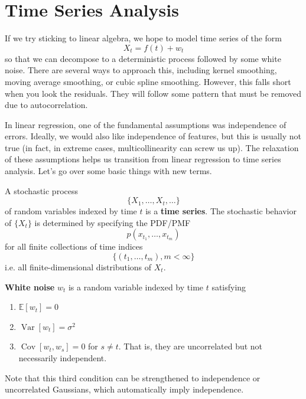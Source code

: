 \documentclass{article}
\DeclareMathOperator{\Cov}{Cov}
\DeclareMathOperator{\Var}{Var}
\begin{document}
\section{Time Series Analysis}

    If we try sticking to linear algebra, we hope to model time series of the form 
    \begin{equation}
      X_t = f(t) + w_t
    \end{equation}
    so that we can decompose to a deterministic process followed by some white noise. There are several ways to approach this, including kernel smoothing, moving average smoothing, or cubic spline smoothing. However, this falls short when you look the residuals. They will follow some pattern that must be removed due to autocorrelation. 

    In linear regression, one of the fundamental assumptions was  independence of errors. Ideally, we would also like independence of features, but this is usually not true (in fact, in extreme cases, multicollinearity can screw us up). The relaxation of these assumptions helps us transition from linear regression to time series analysis. Let's go over some basic things with new terms. 

    \begin{definition}
      A stochastic process 
      \begin{equation}
        \{X_1, \ldots, X_t, \ldots \}
      \end{equation}
      of random variables indexed by time $t$ is a \textbf{time series}. The stochastic behavior of $\{X_t\}$ is determined by specifying the PDF/PMF 
      \begin{equation}
        p(x_{t_1}, \ldots, x_{t_m}) 
      \end{equation}
      for all finite collections of time indices 
      \begin{equation}
        \{(t_1, \ldots, t_m), m < \infty \}
      \end{equation}
      i.e. all finite-dimensional distributions of $X_t$. 
    \end{definition}

    \begin{definition}
      \textbf{White noise} $w_t$ is a random variable indexed by time $t$ satisfying 
      \begin{enumerate}
        \item $\mathbb{E}[w_t] = 0$
        \item $\Var[w_t] = \sigma^2$
        \item $\Cov[w_t, w_s] = 0$ for $s \neq t$. That is, they are uncorrelated but not necessarily independent. 
      \end{enumerate}
      Note that this third condition can be strengthened to independence or uncorrelated Gaussians, which automatically imply independence. 
    \end{definition}
\end{document}
